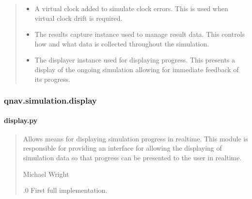 \documentclass[letterpaper,10pt,english]{sphinxmanual}
\begin{document}
\begin{fulllineitems}
\begin{quote}
\begin{description}
\begin{itemize}
\item {} 
\sphinxAtStartPar
{} \textendash{} A virtual clock added to simulate clock errors.
This is used when virtual clock drift is required.

\item {} 
\sphinxAtStartPar
{} \textendash{} The results capture instance used to manage result data.
This controls how and what data is collected throughout the simulation.

\item {} 
\sphinxAtStartPar
{} \textendash{} The displayer instance used for displaying progress.
This presents a display of the ongoing simulation allowing for
immediate feedback of its progress.

\end{itemize}

\end{description}\end{quote}

\end{fulllineitems}


\sphinxstepscope


\subsubsection{qnav.simulation.display}
\label{\detokenize{modules/simulation/display:module-qnav.simulation.display}}\label{\detokenize{modules/simulation/display:qnav-simulation-display}}\label{\detokenize{modules/simulation/display::doc}}

\paragraph{display.py}
\label{\detokenize{modules/simulation/display:display-py}}\begin{quote}\begin{description}
\sphinxAtStartPar
Allows means for displaying simulation progress in real\sphinxhyphen{}time.
This module is responsible for providing an interface for allowing the
displaying of simulation data so that progress can be presented to the
user in real\sphinxhyphen{}time.

\sphinxAtStartPar
Michael Wright \sphinxhyphen{} 

.0 \sphinxhyphen{} First full implementation.

\end{description}\end{quote}
\end{document}
